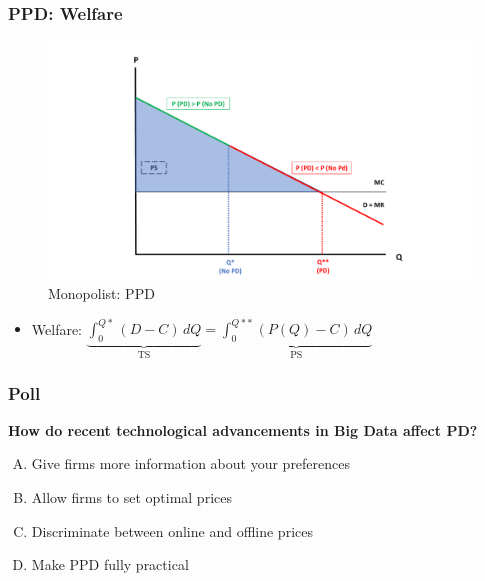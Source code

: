 \documentclass[10pt]{beamer}
\begin{document}
\begin{frame} 
	\frametitle{PPD: Welfare}
	
	
	\begin{figure}[H]
		\centering
		\includegraphics[width=0.78\linewidth]{pd_welf}
		\caption{Monopolist: PPD \\ 
			\label{fig:ppd}}
		
	\end{figure}
	
	\begin{itemize}
	\item Welfare: $\underbrace{\int_{0}^{Q*} (D - C) \,dQ}_\text{TS} = \underbrace{\int_{0}^{Q**} (P(Q) - C)\,dQ }_\text{PS}$
\end{itemize}
	
	
\end{frame}

\begin{frame} 
	\frametitle{Poll}
	
	\begin{center}
		\textbf{How do recent technological advancements in Big Data affect PD?}
	\end{center}	
	
	\begin{enumerate}[(A)]
	\item Give firms more information about your preferences
	\item Allow firms to set optimal prices
	\item Discriminate between online and offline prices
	\item Make PPD fully practical
\end{enumerate}
	
	
\end{frame}
\end{document}

